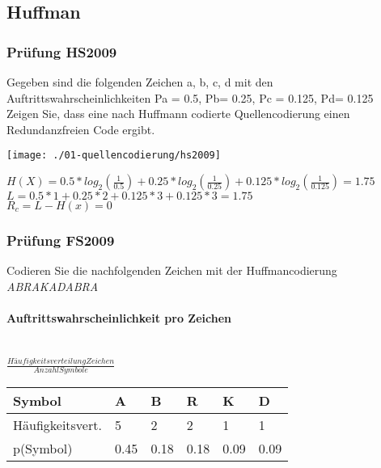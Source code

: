 \subsection{Huffman}
\subsubsection{Prüfung HS2009}
Gegeben sind die folgenden Zeichen a, b, c, d mit den Auftrittswahrscheinlichkeiten 
P{a} = 0.5, P{b}= 0.25, P{c} = 0.125, P{d}= 0.125\\

Zeigen Sie, dass eine nach Huffmann codierte Quellencodierung einen Redundanzfreien 
Code ergibt.
\begin{center}
    \vspace{-8pt}
    \texttt{[image: ./01-quellencodierung/hs2009]}
    \vspace{-8pt}
\end{center}

$H(X) = 0.5*log_2(\frac{1}{0.5})+0.25*log_2(\frac{1}{0.25})+0.125*log_2(\frac{1}{0.125})=1.75$\\
$L=0.5*1+0.25*2+0.125*3+0.125*3=1.75$\\
$R_c=L-H(x)=0$

\subsubsection{Prüfung FS2009}
Codieren Sie die nachfolgenden Zeichen mit der Huffmancodierung\\
\textit{ABRAKADABRA}\\

\paragraph{Auftrittswahrscheinlichkeit pro Zeichen}\mbox{}\\
$\frac{Häufigkeitsverteilung Zeichen}{Anzahl Symbole}$

\begin{center}
    \centering
    \begin{tabular}{p{1.9cm} | p{0.5cm} | p{0.5cm} | p{0.5cm} | p{0.5cm} | p{0.5cm} }
        \bfseries{Symbol} & \bfseries{A} & \bfseries{B} & \bfseries{R} & \bfseries{K} & \bfseries{D}\\ \hline
        Häufigkeitsvert. & 5 & 2 & 2 & 1 & 1\\ 
        p(Symbol) & 0.45 & 0.18 & 0.18 & 0.09 & 0.09
    \end{tabular}
\end{center}

